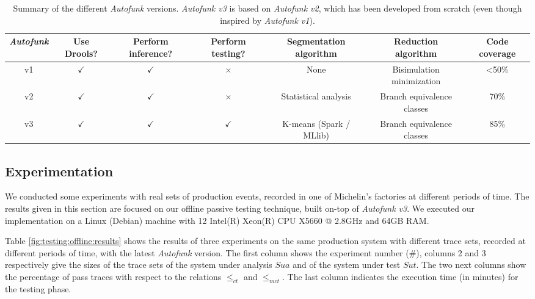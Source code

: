 \begin{sidewaystable}
\begin{center}
    \begin{tabular}{| c | c | c | c | c | c | c |}
        \hline
        \emph{Autofunk} & Use Drools? & Perform inference? & Perform testing? & Segmentation algorithm & Reduction algorithm & Code coverage\\
        \hline
        \hline
        v1 & $\checkmark$ & $\checkmark$ & $\times$ & None & Bisimulation minimization & <50\%\\
        \hline
        v2 & $\checkmark$ & $\checkmark$ & $\times$ & Statistical analysis & Branch equivalence classes & 70\%\\
        \hline
        v3 & $\checkmark$ & $\checkmark$ & $\checkmark$ & K-means (Spark / MLlib) & Branch equivalence classes & 85\%\\
        \hline
    \end{tabular}
\end{center}

    \caption{Summary of the different \emph{Autofunk} versions.
    \emph{Autofunk v3} is based on \emph{Autofunk v2}, which
    has been developed from scratch (even though inspired by
    \emph{Autofunk v1}).}

    \label{fig:autofunk-versions}
\end{sidewaystable}

\subsection{Experimentation}

We conducted some experiments with real sets of production
events, recorded in one of Michelin's factories at different
periods of time. The results given in this section are focused on
our offline passive testing technique, built on-top of
\emph{Autofunk v3}. We executed our implementation on a Linux
(Debian) machine with 12 Intel(R) Xeon(R) CPU X5660 @ 2.8GHz and
64GB RAM.

Table \ref{fig:testing:offline:results} shows the results of
three experiments on the same production system with different
trace sets, recorded at different periods of time, with the
latest \emph{Autofunk} version. The first column shows the
experiment number (\#), columns 2 and 3 respectively give the
sizes of the trace sets of the system under analysis
$\mathit{Sua}$ and of the system under test $\mathit{Sut}$. The
two next columns show the percentage of pass traces with respect
to the relations $\leq_{ct}$ and $\leq_{mct}$. The last column
indicates the execution time (in minutes) for the testing phase.

